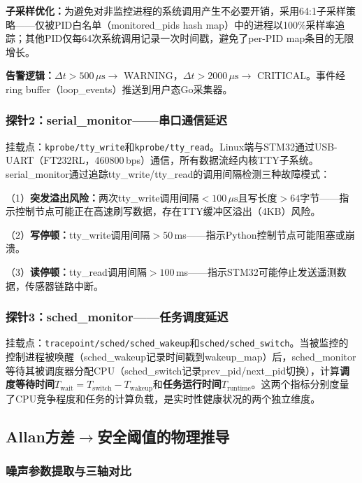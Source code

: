 \documentclass{rjthesis}
\begin{document}
\textbf{子采样优化：}为避免对非监控进程的系统调用产生不必要开销，采用64:1子采样策略——仅被PID白名单（monitored\_pids hash map）中的进程以100\%采样率追踪；其他PID仅每64次系统调用记录一次时间戳，避免了per-PID map条目的无限增长。

\textbf{告警逻辑：}$\Delta t > 500\,\mu\text{s} \to$ WARNING，$\Delta t > 2000\,\mu\text{s} \to$ CRITICAL。事件经ring buffer（loop\_events）推送到用户态Go采集器。

\subsubsection{探针2：serial\_monitor——串口通信延迟}

挂载点：\texttt{kprobe/tty\_write}和\texttt{kprobe/tty\_read}。Linux端与STM32通过USB-UART（FT232RL，460800\,bps）通信，所有数据流经内核TTY子系统。serial\_monitor通过追踪tty\_write/tty\_read的调用间隔检测三种故障模式：

（1）\textbf{突发溢出风险：}两次tty\_write调用间隔$<100\,\mu\text{s}$且写长度$>64$字节——指示控制节点可能正在高速刷写数据，存在TTY缓冲区溢出（4KB）风险。

（2）\textbf{写停顿：}tty\_write调用间隔$>50$\,ms——指示Python控制节点可能阻塞或崩溃。

（3）\textbf{读停顿：}tty\_read调用间隔$>100$\,ms——指示STM32可能停止发送遥测数据，传感器链路中断。

\subsubsection{探针3：sched\_monitor——任务调度延迟}

挂载点：\texttt{tracepoint/sched/sched\_wakeup}和\texttt{sched/sched\_switch}。当被监控的控制进程被唤醒（sched\_wakeup记录时间戳到wakeup\_map）后，sched\_monitor等待其被调度器分配CPU（sched\_switch记录prev\_pid/next\_pid切换），计算\textbf{调度等待时间}$T_{\text{wait}} = T_{\text{switch}} - T_{\text{wakeup}}$和\textbf{任务运行时间}$T_{\text{runtime}}$。这两个指标分别度量了CPU竞争程度和任务的计算负载，是实时性健康状况的两个独立维度。

\subsection{Allan方差$\to$安全阈值的物理推导}

\subsubsection{噪声参数提取与三轴对比}
\end{document}
